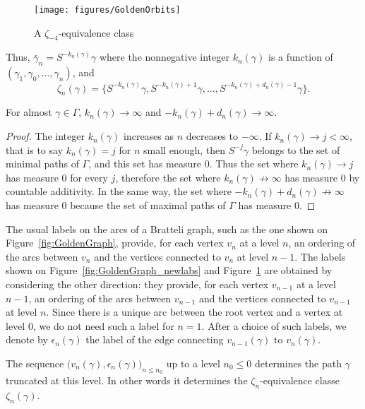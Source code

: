 \documentclass[12pt,a4paper]{article}
\begin{document}
\begin{figure}[!h]
\centering
\texttt{[image: figures/GoldenOrbits]}
\caption{A $\zeta_{-4}$-equivalence class}
\label{fig:GoldenOrbits}
\end{figure}

Thus, $\boxed{\bar\gamma_n = S^{-k_n(\gamma)}\gamma}$ where the nonnegative integer $k_n(\gamma)$ 
is a function of $(\gamma_{1}, \gamma_0, \ldots, \gamma_n)$, and 
$$
\zeta_n(\gamma) = \{S^{-k_n(\gamma)}\gamma, S^{-k_n(\gamma)+1}\gamma, 
\ldots, S^{-k_n(\gamma)+d_n(\gamma)-1}\gamma \}.
$$ 

\begin{lemma}\label{lemma:infinitelimits}
For almost $\gamma \in \Gamma$, 
$k_n(\gamma) \to \infty$ and $-k_n(\gamma)+d_n(\gamma) \to \infty$.
\end{lemma}

\begin{proof}
The integer $k_n(\gamma)$ increases as $n$ decreases to $-\infty$. 
If $k_n(\gamma) \to j < \infty$, that is to say $k_n(\gamma)=j$ for $n$ small 
enough, then $S^{-j}\gamma$ belongs to the set of minimal paths 
of $\Gamma$, and this set has measure $0$. 
Thus the set where $k_n(\gamma) \to j$ has measure $0$ for every $j$, 
therefore the set where $k_n(\gamma) \not\to \infty$ has measure $0$ 
by countable additivity. 
In the same way, the set where $-k_n(\gamma)+d_n(\gamma) \not\to \infty$ 
has measure $0$ because the set of maximal paths of $\Gamma$ has measure $0$.
\end{proof}

The usual labels on the arcs of a Bratteli graph, such as the one 
shown on Figure~\ref{fig:GoldenGraph}, provide, for each vertex $v_n$ 
at a level $n$, an ordering of the arcs between $v_n$ and the vertices connected 
to $v_n$ at level $n-1$.  
The labels shown on Figure~\ref{fig:GoldenGraph_newlabs} and Figure~\ref{fig:GoldenOrbits} 
are obtained by considering the other direction: they provide, 
for each vertex $v_{n-1}$ at a level $n-1$, 
an ordering of the arcs between $v_{n-1}$ and the vertices connected 
to $v_{n-1}$ at level $n$. 
Since there is a unique arc between the root vertex and a vertex at level $0$, 
we do not need such a label for $n=1$. 
After a choice of such labels, we denote 
by $\boxed{\epsilon_n(\gamma)}$ the label of the edge connecting $v_{n-1}(\gamma)$ to 
$v_n(\gamma)$. 
 
The sequence $\bigl(v_n(\gamma), \epsilon_n(\gamma)\bigr)_{n \leq n_0}$ up to 
a level $n_0 \leq 0$ determines the path $\gamma$ truncated at this level. 
In other words it determines the $\zeta_{n}$-equivalence classe 
$\zeta_n(\gamma)$. 
\end{document}
